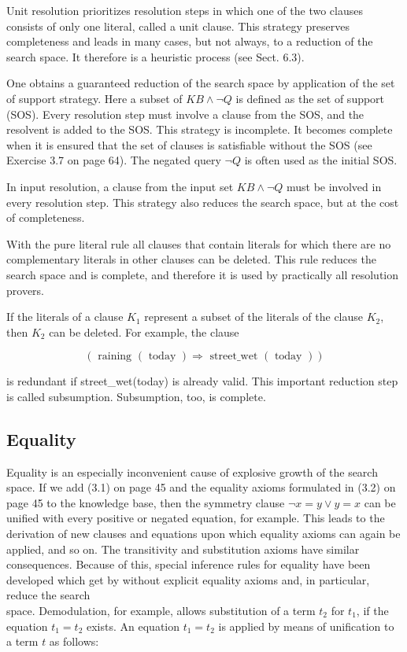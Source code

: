 \documentclass[10pt]{book}
\begin{document}
Unit resolution prioritizes resolution steps in which one of the two clauses consists of only one literal, called a unit clause. This strategy preserves completeness and leads in many cases, but not always, to a reduction of the search space. It therefore is a heuristic process (see Sect. 6.3).

One obtains a guaranteed reduction of the search space by application of the set of support strategy. Here a subset of $K B \wedge \neg Q$ is defined as the set of support (SOS). Every resolution step must involve a clause from the SOS, and the resolvent is added to the SOS. This strategy is incomplete. It becomes complete when it is ensured that the set of clauses is satisfiable without the SOS (see Exercise 3.7 on page 64). The negated query $\neg Q$ is often used as the initial SOS.

In input resolution, a clause from the input set $K B \wedge \neg Q$ must be involved in every resolution step. This strategy also reduces the search space, but at the cost of completeness.

With the pure literal rule all clauses that contain literals for which there are no complementary literals in other clauses can be deleted. This rule reduces the search space and is complete, and therefore it is used by practically all resolution provers.

If the literals of a clause $K_{1}$ represent a subset of the literals of the clause $K_{2}$, then $K_{2}$ can be deleted. For example, the clause

$$
(\text { raining }(\text { today }) \Rightarrow \text { street_wet }(\text { today }))
$$

is redundant if street\_wet(today) is already valid. This important reduction step is called subsumption. Subsumption, too, is complete.

\subsection{Equality}
Equality is an especially inconvenient cause of explosive growth of the search space. If we add (3.1) on page 45 and the equality axioms formulated in (3.2) on page 45 to the knowledge base, then the symmetry clause $\neg x=y \vee y=x$ can be unified with every positive or negated equation, for example. This leads to the derivation of new clauses and equations upon which equality axioms can again be applied, and so on. The transitivity and substitution axioms have similar consequences. Because of this, special inference rules for equality have been developed which get by without explicit equality axioms and, in particular, reduce the search\\
space. Demodulation, for example, allows substitution of a term $t_{2}$ for $t_{1}$, if the equation $t_{1}=t_{2}$ exists. An equation $t_{1}=t_{2}$ is applied by means of unification to a term $t$ as follows:
\end{document}
